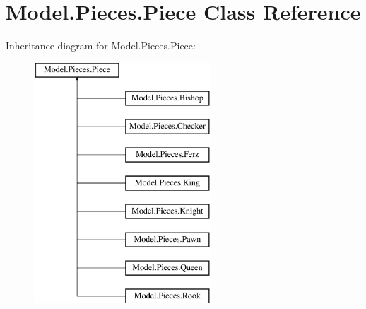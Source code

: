 \hypertarget{class_model_1_1_pieces_1_1_piece}{}\section{Model.\+Pieces.\+Piece Class Reference}
\label{class_model_1_1_pieces_1_1_piece}
Inheritance diagram for Model.\+Pieces.\+Piece\+:\begin{figure}[H]
\begin{center}
\leavevmode
\includegraphics[height=9.000000cm]{class_model_1_1_pieces_1_1_piece}
\end{center}
\end{figure}
